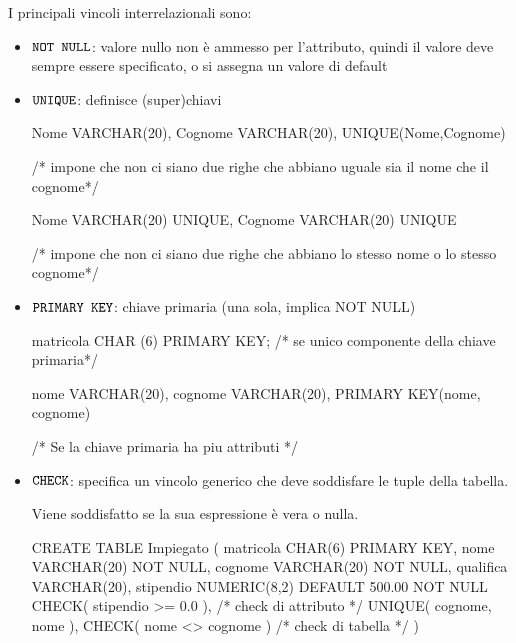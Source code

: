   I principali vincoli interrelazionali sono:
  \begin{itemize}[label=$\diamond$, itemsep=\medskipamount]
    \item $\verb|NOT NULL|$: valore nullo non è ammesso per l'attributo, quindi il valore deve sempre essere specificato, o si assegna un valore di default
    \item $\verb|UNIQUE|$: definisce (super)chiavi
    \begin{sqlcode}
      Nome VARCHAR(20),
      Cognome VARCHAR(20),
      UNIQUE(Nome,Cognome)

      /* impone che non ci siano due righe che abbiano uguale sia il nome che il cognome*/
    \end{sqlcode}

    \begin{sqlcode}
      Nome VARCHAR(20) UNIQUE,
      Cognome VARCHAR(20) UNIQUE

      /* impone che non ci siano due righe che abbiano lo stesso nome o lo stesso cognome*/ 
    \end{sqlcode}
    \item $\verb|PRIMARY KEY|$: chiave primaria (una sola, implica NOT NULL) 
    \begin{sqlcode}
      matricola CHAR (6) PRIMARY KEY;
      /* se unico componente della chiave primaria*/
    \end{sqlcode}

    \begin{sqlcode}
      nome VARCHAR(20),
      cognome VARCHAR(20),
      PRIMARY KEY(nome, cognome)

      /* Se la chiave primaria ha piu attributi */
    \end{sqlcode}
    \item $\verb|CHECK|$: specifica un vincolo generico che deve soddisfare le tuple della tabella. 
    
    Viene soddisfatto se la sua espressione è vera o nulla.
    \begin{sqlcode}
      CREATE TABLE Impiegato (
        matricola CHAR(6) PRIMARY KEY,
        nome VARCHAR(20) NOT NULL,
        cognome VARCHAR(20) NOT NULL,
        qualifica VARCHAR(20),
        stipendio NUMERIC(8,2) DEFAULT 500.00 NOT NULL
        CHECK( stipendio >= 0.0 ),    /* check di attributo */
        UNIQUE( cognome, nome ),
        CHECK( nome <> cognome )      /* check di tabella */
      )
    \end{sqlcode}
  \end{itemize}

